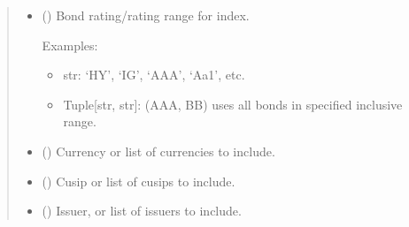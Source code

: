\documentclass[letterpaper,10pt,english]{report}
\begin{document}
\begin{fulllineitems}
\begin{fulllineitems}
\begin{quote}
\begin{description}
\begin{itemize}
\item {} 
 (\sphinxstyleliteralemphasis{\sphinxupquote{ , }}\sphinxstyleliteralemphasis{\sphinxupquote{{[}}}\sphinxstyleliteralemphasis{\sphinxupquote{, }}\sphinxstyleliteralemphasis{\sphinxupquote{{]}}}\sphinxstyleliteralemphasis{\sphinxupquote{, }}) \textendash{} 
Bond rating/rating range for index.

Examples:
\begin{itemize}
\item {} 
str: ‘HY’, ‘IG’, ‘AAA’, ‘Aa1’, etc.

\item {} 
Tuple{[}str, str{]}: (AAA, BB) uses all bonds in
specified inclusive range.

\end{itemize}


\item {} 
 (\sphinxstyleliteralemphasis{\sphinxupquote{, }}\sphinxstyleliteralemphasis{\sphinxupquote{{[}}}\sphinxstyleliteralemphasis{\sphinxupquote{{]}}}\sphinxstyleliteralemphasis{\sphinxupquote{, }}) \textendash{} Currency or list of currencies to include.

\item {} 
 (\sphinxstyleliteralemphasis{\sphinxupquote{, }}\sphinxstyleliteralemphasis{\sphinxupquote{{[}}}\sphinxstyleliteralemphasis{\sphinxupquote{{]}}}\sphinxstyleliteralemphasis{\sphinxupquote{,}}) \textendash{} Cusip or list of cusips to include.

\item {} 
 (\sphinxstyleliteralemphasis{\sphinxupquote{, }}\sphinxstyleliteralemphasis{\sphinxupquote{{[}}}\sphinxstyleliteralemphasis{\sphinxupquote{{]}}}\sphinxstyleliteralemphasis{\sphinxupquote{, }}) \textendash{} Issuer, or list of issuers to include.


\end{itemize}
\end{description}
\end{quote}
\end{fulllineitems}
\end{fulllineitems}
\end{document}
